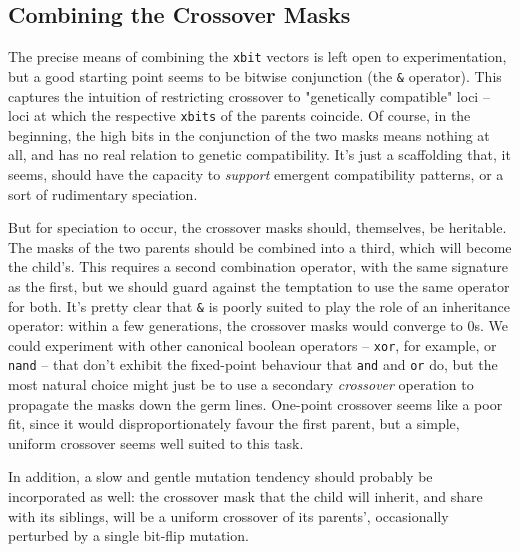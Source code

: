 \documentclass[11pt]{article}
\begin{document}
\subsection{Combining the Crossover Masks}
\label{sec:orgae05e80}
\label{org0774328}

The precise means of combining the \texttt{xbit} vectors is left open to
experimentation, but a good starting point seems to be bitwise conjunction (the
\texttt{\&} operator). This captures the intuition of restricting crossover to
"genetically compatible" loci -- loci at which the respective \texttt{xbits} of the
parents coincide. Of course, in the beginning, the high bits in the conjunction
of the two masks means nothing at all, and has no real relation to genetic
compatibility. It's just a scaffolding that, it seems, should have the capacity
to \emph{support} emergent compatibility patterns, or a sort of rudimentary
speciation.

But for speciation to occur, the crossover masks should, themselves, be
heritable. The masks of the two parents should be combined into a third,
which will become the child's. This requires a second combination operator,
with the same signature as the first, but we should guard against the
temptation to use the same operator for both. It's pretty clear that \texttt{\&}
is poorly suited to play the role of an inheritance operator: within a
few generations, the crossover masks would converge to 0s. We could
experiment with other canonical boolean operators -- \texttt{xor}, for example,
or \texttt{nand} -- that don't exhibit the fixed-point behaviour that \texttt{and} and
\texttt{or} do, but the most natural choice might just be to use a secondary
\emph{crossover} operation to propagate the masks down the germ lines.
One-point crossover seems like a poor fit, since it would disproportionately
favour the first parent, but a simple, uniform crossover seems well
suited to this task.

In addition, a slow and gentle mutation tendency should probably be 
incorporated as well: the crossover mask that the child will inherit,
and share with its siblings, will be a uniform crossover of its
parents', occasionally perturbed by a single bit-flip mutation.
\end{document}
